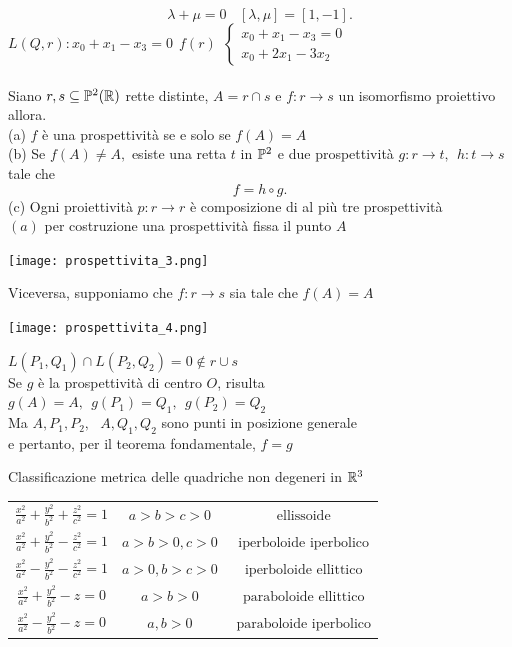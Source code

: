 \documentclass[12px]{article}
\begin{document}
\[
	\lambda + \mu =0 \ \ \ \ [\lambda,\mu] = [1,-1]
.\] 
$L(Q,r):x_0+x_1-x_3=0 \ \ f(r) \ \  \begin{cases}
	x_0+x_1-x_3=0\\
	x_0+2x_1-3x_2
\end{cases}$
\ \\ \hline\ \\ 
Siano $r,s\subseteq\mathbb{P}^2(\mathbb{R})$ rette distinte, $A=r\cap s$ e $f:r \rightarrow s$ un isomorfismo proiettivo allora.\\
(a) $f$ è una prospettività se e solo se $f(A) = A$\\
(b) Se  $f(A)\neq A , $ esiste una retta $t$ in $\mathbb{P}^2$ e due prospettività $g: r \rightarrow t, \ \ h : t \rightarrow s$ tale che
\[
 f = h\circ g
.\] 
(c) Ogni proiettività $p:r \rightarrow r$ è composizione di al più tre prospettività
\\
$(a)$ per costruzione una prospettività fissa il punto $A$\\
\begin{center}
\texttt{[image: prospettivita\_3.png]}
\end{center}
 Viceversa, supponiamo che $f:r \rightarrow s$ sia tale che $f(A) = A$ 
\begin{center}
\texttt{[image: prospettivita\_4.png]}
\end{center}
 $L(P_1,Q_1)\cap L(P_2,Q_2) = 0 \not \in r\cup s$\\
 Se $g$ è la prospettività di centro $O$, risulta $g(A) = A,\ \  g(P_1)=Q_1, \ \ g(P_2)=Q_2$\\
 Ma $A,P_1,P_2, \ \ \ A,Q_1,Q_2$ sono punti in posizione generale\\
 e pertanto, per il teorema fondamentale, $f=g$
 \newpage
 \begin{nome}
 	Classificazione metrica delle quadriche  non degeneri in $\mathbb{R}^3$
	\begin{center}
		
	\begin{tabular}{ c c c }
		$\frac{x^2}{a^2} + \frac{y^2}{b^2} + \frac{z^2}{c^2}=1$ &$ a > b > c > 0$ & $\text{ ellissoide}$ \\ 
		$\frac{x^2}{a^2} + \frac{y^2}{b^2} - \frac{z^2}{c^2}=1$ &$ a > b >0, c > 0$ & $\text{ iperboloide iperbolico} $\\
		$\frac{x^2}{a^2} - \frac{y^2}{b^2} - \frac{z^2}{c^2}=1$ &$ a > 0,b > c > 0$ & $\text{ iperboloide ellittico} $\\ 
		$\frac{x^2}{a^2} + \frac{y^2}{b^2} - z = 0$ &$ a > b > 0$ & $\text{ paraboloide ellittico} $\\ 
		$\frac{x^2}{a^2} - \frac{y^2}{b^2} - z=0$ &$ a, b > 0$ & $\text{ paraboloide iperbolico} $\\ 
	\end{tabular}
	\end{center}
 \end{nome}
\end{document}
